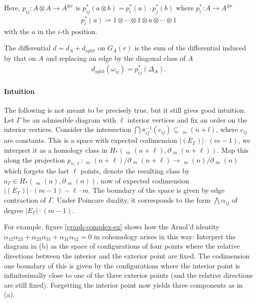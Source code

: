 \documentclass{scrartcl}
\theoremstyle{plain}
\theoremstyle{definition}
\renewcommand{\subset}{\subseteq}
\newcommand{\defeq}{\coloneqq}
\DeclareMathOperator{\cConf}{\overline{Conf}}
\newcommand{\abs}[1]{\left\lvert#1\right\rvert}
\begin{document}
Here, $p_{ij} \colon A\otimes A \to A^{\otimes r}$ is $p_{ij}^*(a\otimes b) = p_i^*(a)\cdot p_j^*(b)$ where $p_i^*\colon A\to A^{\otimes r}$
\begin{align*}
    p_i^*(a) \defeq 1\otimes \cdots \otimes 1\otimes a\otimes\cdots\otimes 1
\end{align*}
with the $a$ in the $i$-th position. 

The differential $d = d_A + d_{split}$ on $G_A(r)$ is the sum of the differential induced by that on $A$ and replacing an edge by the diagonal class of $A$
\begin{align*}
    d_{split}(\omega_{ij}) = p_{ij}^*(\Delta_A).
\end{align*}



\paragraph{Intuition} The following is not meant to be precisely true, but it still gives good intuition. Let $\Gamma$ be an admissible diagram with $\ell$ interior vertices and fix an order on the interior vertices. Consider the intersection $\bigcap \pi_{ij}^{-1}(c_{ij})\subset \cConf_m(n+l)$, where $c_{ij}$ are constants. This is a space with expected codimension $\abs{(E_\Gamma)}\cdot (m-1)$, we interpret it as a homology class in $H_*(\cConf_m(n+\ell), \partial\cConf_m(n+\ell))$. Map this along the projection $p_{n,\ell}\colon \cConf_m(n+\ell)/\partial\cConf_m(n+\ell) \to \cConf_m(n)/\partial\cConf_m(n)$ which forgets the last $\ell$ points, denote the resulting class by $a_\Gamma\in H_*(\cConf_m(n), \partial\cConf_m(n))$, now of expected codimension $\abs{(E_\Gamma)}\cdot (m-1) - \ell\cdot m$. The boundary of the space is given by edge contraction of $\Gamma$. Under Poincare duality, it corresponds to the form $\bigwedge \alpha_{ij}$ of degree $\abs{E_\Gamma}\cdot (m-1)$. 

For example, figure \ref{graph-complex-ex} shows how the Arnol'd identity $\alpha_{12}\alpha_{23} + \alpha_{23}\alpha_{31} + \alpha_{31}\alpha_{12} = 0$ in cohomology arises in this way: Interpret the diagram in (b) as the space of configurations of four points where the relative directions between the interior and the exterior point are fixed. The codimension one boundary of this is given by the configurations where the interior point is infinitesimally close to one of the three exterior points (and the relative directions are still fixed). Forgetting the interior point now yields three components as in (a).  
\end{document}
